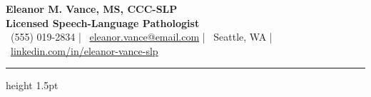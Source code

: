 \documentclass[10pt]{article}
\begin{document}
\color{darktext}

\begin{center}
  {\Huge\bfseries\color{primary} Eleanor M. Vance, MS, CCC-SLP} \\
  \vspace{4pt}
  {\color{secondary}\bfseries\large Licensed Speech-Language Pathologist} \\
  \vspace{6pt}
  {\color{secondary}\small
    \faPhone\ (555) 019-2834 \quad | \quad 
    \faEnvelope\ \href{mailto:eleanor.vance@email.com}{eleanor.vance@email.com} \quad | \quad 
    \faMapMarker\ Seattle, WA \quad | \quad 
    \faLinkedin\ \href{https://linkedin.com/in/eleanor-vance-slp}{linkedin.com/in/eleanor-vance-slp}
  }
\end{center}
\vspace{-5pt}
{\color{divider}\hrule height 1.5pt}
\vspace{8pt}
\end{document}
